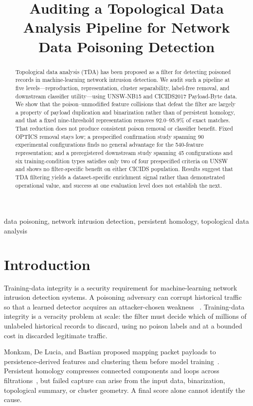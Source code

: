 \documentclass[conference]{IEEEtran}
\title{Auditing a Topological Data Analysis Pipeline for Network Data Poisoning
Detection}
\author{\IEEEauthorblockN{Christian Dane Beels}
\IEEEauthorblockA{Department of Mathematical Sciences\\
United States Military Academy\\
West Point, New York, USA}}
\begin{document}
\maketitle

\begin{abstract}
Topological data analysis (TDA) has been proposed as a filter for detecting poisoned
records in machine-learning network intrusion detection. We audit such a pipeline at
five levels---reproduction, representation, cluster separability, label-free removal,
and downstream classifier utility---using UNSW-NB15 and CICIDS2017 Payload-Byte data.
We show that the poison--unmodified feature collisions that defeat the filter are
largely a property of payload duplication and binarization rather than of persistent
homology, and that a fixed nine-threshold representation removes 92.0--95.9\%
of exact matches. That reduction does not produce consistent poison removal or
classifier benefit. Fixed OPTICS removal stays low; a prespecified confirmation
study spanning 90 experimental configurations
finds no general advantage for the 540-feature representation; and a
preregistered downstream study spanning 45 configurations and six training-condition
types satisfies only two of four prespecified criteria on UNSW and shows no filter-specific benefit on
either CICIDS population. Results suggest that TDA filtering yields a dataset-specific enrichment
signal rather than demonstrated operational value, and success at one evaluation level does
not establish the next.
\end{abstract}

\begin{IEEEkeywords}
data poisoning, network intrusion detection, persistent homology, topological data analysis
\end{IEEEkeywords}

\section{Introduction}
Training-data integrity is a security requirement for machine-learning network
intrusion detection systems. A poisoning adversary can corrupt historical
traffic so that a learned detector acquires an attacker-chosen weakness
~\cite{biggio2018}. Training-data integrity is a veracity problem at scale: the
filter must decide which of millions of unlabeled historical records to discard,
using no poison labels and at a bounded cost in discarded legitimate traffic.

Monkam, De Lucia, and Bastian proposed mapping packet payloads to
persistence-derived features and clustering them before model
training~\cite{monkam2024}. Persistent homology compresses connected
components and loops across filtrations~\cite{carlsson2009,cohensteiner2007},
but failed capture can arise from the input data, binarization, topological
summary, or cluster geometry. A final score alone cannot identify the cause.
\end{document}
